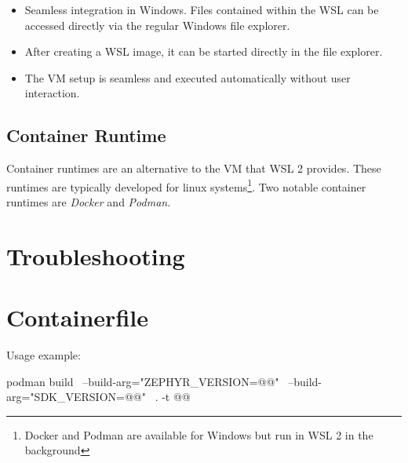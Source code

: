 \begin{itemize}
  \item Seamless integration in Windows.
    Files contained within the WSL can be accessed directly via the regular Windows file explorer.
  \item After creating a WSL image, it can be started directly in the file explorer.
  \item The VM setup is seamless and executed automatically without user
    interaction.
\end{itemize}

\subsection{Container Runtime}
Container runtimes are an alternative to the VM that WSL 2 provides.
These runtimes are typically developed for linux systems\footnote{Docker and Podman are available for Windows but run in WSL 2 in the background}.
Two notable container runtimes are \emph{Docker} and \emph{Podman}.

\newpage



\newpage



\newpage


\newpage


\newpage

\appendix

\fancyfoot{}



\section{Troubleshooting}



\newpage
{}

\section{Containerfile}\label{containerfile}



Usage example:

\begin{monobox}
podman build \
  --build-arg="ZEPHYR_VERSION=@\zephyrversion{}@" \
  --build-arg="SDK_VERSION=@\sdkversion{}@" \
  . -t @\imagename{}@
\end{monobox}



